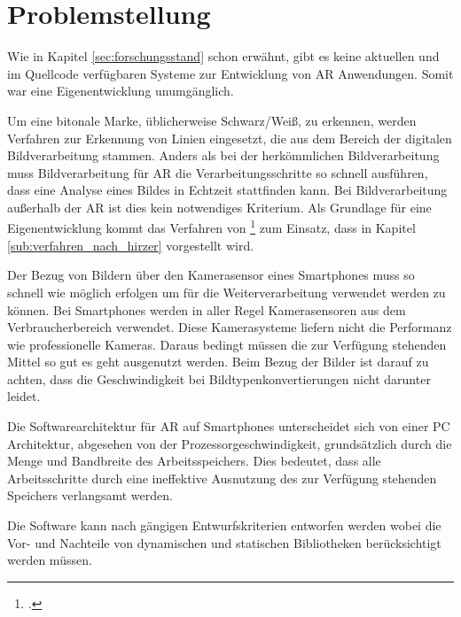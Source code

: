 \section{Problemstellung} %
\label{sec:problemstellung}
\begin{comment}
	Problemstellung: Problemstellung und Frage im Detail erläutern
\end{comment}

Wie in Kapitel \ref{sec:forschungsstand} schon erwähnt, gibt es keine aktuellen und im Quellcode verfügbaren Systeme zur Entwicklung von \gls{AR} Anwendungen. Somit war eine Eigenentwicklung unumgänglich.

Um eine bitonale Marke, üblicherweise Schwarz/Weiß, zu erkennen, werden Verfahren zur Erkennung von Linien eingesetzt,
 die aus dem Bereich der digitalen Bildverarbeitung stammen. Anders als bei der herkömmlichen Bildverarbeitung muss
 Bildverarbeitung für \gls{AR} die Verarbeitungsschritte so schnell ausführen, dass eine Analyse eines Bildes in
 Echtzeit stattfinden kann. Bei Bildverarbeitung außerhalb der \gls{AR} ist dies kein notwendiges Kriterium. Als
 Grundlage für eine Eigenentwicklung kommt das Verfahren von \citeauthor{clarke96}\footcite{clarke96} zum Einsatz,
 dass in Kapitel \ref{sub:verfahren_nach_hirzer} vorgestellt wird.

Der Bezug von Bildern über den Kamerasensor eines Smartphones muss so schnell wie möglich erfolgen um für die Weiterverarbeitung verwendet werden zu können. Bei Smartphones werden in aller Regel Kamerasensoren aus dem Verbraucherbereich verwendet. Diese Kamerasysteme liefern nicht die Performanz wie professionelle Kameras. Daraus bedingt müssen die zur Verfügung stehenden Mittel so gut es geht ausgenutzt werden. Beim Bezug der Bilder ist darauf zu achten, dass die Geschwindigkeit bei Bildtypenkonvertierungen nicht darunter leidet.

Die Softwarearchitektur für \gls{AR} auf Smartphones unterscheidet sich von einer PC Architektur, abgesehen von der Prozessorgeschwindigkeit, grundsätzlich durch die Menge und Bandbreite des Arbeitsspeichers. Dies bedeutet, dass alle Arbeitsschritte durch eine ineffektive Ausnutzung des zur Verfügung stehenden Speichers verlangsamt werden.

Die Software kann nach gängigen Entwurfskriterien entworfen werden wobei die Vor- und Nachteile von dynamischen und statischen Bibliotheken berücksichtigt werden müs\-sen.

